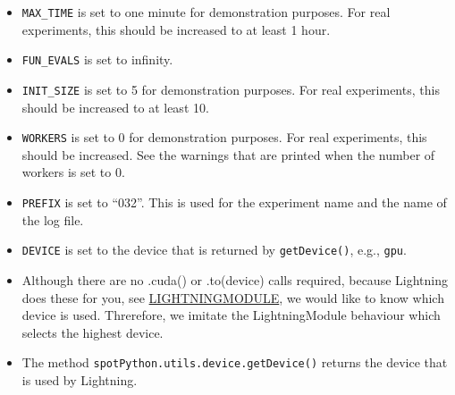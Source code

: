 \documentclass[
  letterpaper,
  DIV=11,
  numbers=noendperiod]{scrreprt}
\providecommand{\tightlist}{%
  \setlength{\itemsep}{0pt}\setlength{\parskip}{0pt}}\usepackage{longtable,booktabs,array}
\begin{document}
\begin{tcolorbox}[enhanced jigsaw, left=2mm, opacitybacktitle=0.6, leftrule=.75mm, toptitle=1mm, opacityback=0, colback=white, rightrule=.15mm, colframe=quarto-callout-caution-color-frame, title=\textcolor{quarto-callout-caution-color}{\faFire}\hspace{0.5em}{Caution: Run time and initial design size should be increased for real
experiments}, toprule=.15mm, coltitle=black, bottomrule=.15mm, bottomtitle=1mm, colbacktitle=quarto-callout-caution-color!10!white, titlerule=0mm, breakable, arc=.35mm]

\begin{itemize}
\tightlist
\item
  \texttt{MAX\_TIME} is set to one minute for demonstration purposes.
  For real experiments, this should be increased to at least 1 hour.
\item
  \texttt{FUN\_EVALS} is set to infinity.
\item
  \texttt{INIT\_SIZE} is set to 5 for demonstration purposes. For real
  experiments, this should be increased to at least 10.
\item
  \texttt{WORKERS} is set to 0 for demonstration purposes. For real
  experiments, this should be increased. See the warnings that are
  printed when the number of workers is set to 0.
\item
  \texttt{PREFIX} is set to ``032''. This is used for the experiment
  name and the name of the log file.
\item
  \texttt{DEVICE} is set to the device that is returned by
  \texttt{getDevice()}, e.g., \texttt{gpu}.
\end{itemize}

\end{tcolorbox}

\begin{tcolorbox}[enhanced jigsaw, left=2mm, opacitybacktitle=0.6, leftrule=.75mm, toptitle=1mm, opacityback=0, colback=white, rightrule=.15mm, colframe=quarto-callout-note-color-frame, title=\textcolor{quarto-callout-note-color}{\faInfo}\hspace{0.5em}{Note: Device selection}, toprule=.15mm, coltitle=black, bottomrule=.15mm, bottomtitle=1mm, colbacktitle=quarto-callout-note-color!10!white, titlerule=0mm, breakable, arc=.35mm]

\begin{itemize}
\tightlist
\item
  Although there are no .cuda() or .to(device) calls required, because
  Lightning does these for you, see
  \href{https://lightning.ai/docs/pytorch/stable/common/lightning_module.html}{LIGHTNINGMODULE},
  we would like to know which device is used. Threrefore, we imitate the
  LightningModule behaviour which selects the highest device.
\item
  The method \texttt{spotPython.utils.device.getDevice()} returns the
  device that is used by Lightning.
\end{itemize}

\end{tcolorbox}
\end{document}
